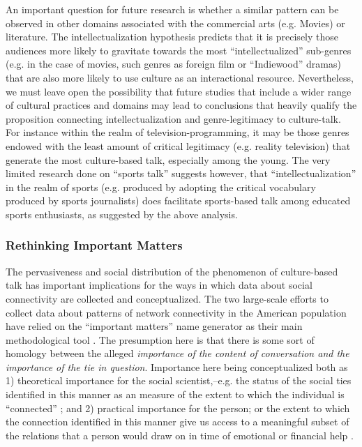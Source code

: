 \documentclass[11pt]{article}
\begin{document}
An important question for future research is whether a similar pattern can be observed in other domains associated with the commercial arts (e.g. Movies) or literature. The intellectualization hypothesis predicts that it is precisely those audiences more likely to gravitate towards the most ``intellectualized'' sub-genres (e.g.  in the case of movies, such genres as foreign film or ``Indiewood'' dramas) that are also more likely to use culture as an interactional resource.    Nevertheless, we must leave open the possibility that future studies that include a wider range of cultural practices and domains may lead to conclusions that heavily qualify the proposition connecting intellectualization and genre-legitimacy to culture-talk.  For instance within the realm of television-programming, it may be those genres endowed with the least amount of critical legitimacy (e.g. reality television) that generate the most culture-based talk, especially among the young.  The very limited research done on ``sports talk'' \citep{purcell07} suggests however, that ``intellectualization'' in the realm of sports (e.g. produced by adopting the critical vocabulary produced by sports journalists) does facilitate sports-based talk among educated sports enthusiasts, as suggested by the above analysis. 
 
\subsubsection{Rethinking Important Matters}
The pervasiveness and social distribution of the phenomenon of culture-based talk has important implications for the ways in which data about social connectivity are collected and conceptualized.  The two large-scale efforts to collect data about patterns of network connectivity in the American population have relied on the ``important matters'' name generator as their main methodological tool \citep{burt84, marsden87, mcpherson_etal06}. The presumption here is that there is some sort of homology between the alleged \emph{importance of the content of conversation and the importance of the tie in question}.  Importance here being conceptualized both as 1) theoretical importance for the social scientist,--e.g. the status of the social ties identified in this manner as an measure of the extent to which the individual is ``connected'' \citep{burt90}; and 2) practical importance for the person; or the extent to which the connection identified in this manner give us access to a meaningful subset of the relations that a person would draw on in time of emotional or financial help \citep{wellman_wortley90}.
\end{document}
